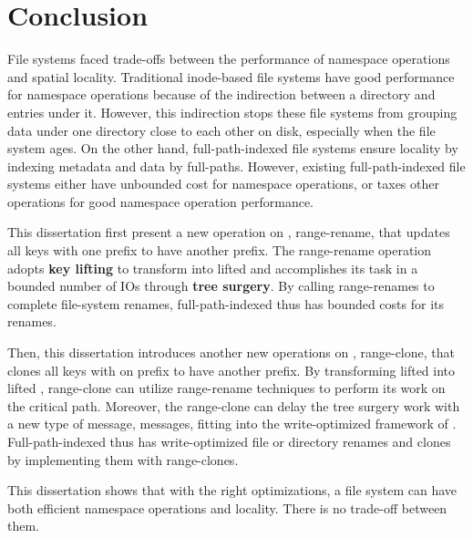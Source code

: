 \chapter{Conclusion}
\label{chap:conclusion}

File systems faced trade-offs between the performance of namespace
operations and spatial locality.
Traditional inode-based file systems have good performance for namespace
operations because of the indirection between a directory and entries under it.
However, this indirection stops these file systems from grouping data under one
directory close to each other on disk,
especially when the file system ages.
On the other hand, full-path-indexed file systems ensure locality by indexing
metadata and data by full-paths.
However, existing full-path-indexed file systems either have unbounded cost for
namespace operations, or taxes other operations for good namespace operation
performance.

This dissertation first present a new operation on \bets, range-rename,
that updates all keys with one prefix to have another prefix.
The range-rename operation adopts \textbf{key lifting} to transform \bets into
lifted \bets
and accomplishes its task in a bounded number of IOs through
\textbf{tree surgery}.
By calling range-renames to complete file-system renames, full-path-indexed
\betrfs thus has bounded costs for its renames.

Then, this dissertation introduces another new operations on \bets, range-clone,
that clones all keys with on prefix to have another prefix.
By transforming lifted \bets into lifted \bedags, range-clone can utilize
range-rename techniques to perform its work on the critical path.
Moreover, the range-clone can delay the tree surgery work with a new type of
message, \goto messages, fitting into the write-optimized framework of \betrfs.
Full-path-indexed \betrfs thus has write-optimized file or directory renames and
clones by implementing them with range-clones.

This dissertation shows that with the right optimizations, a file system can
have both efficient namespace operations and locality.
There is no trade-off between them.

